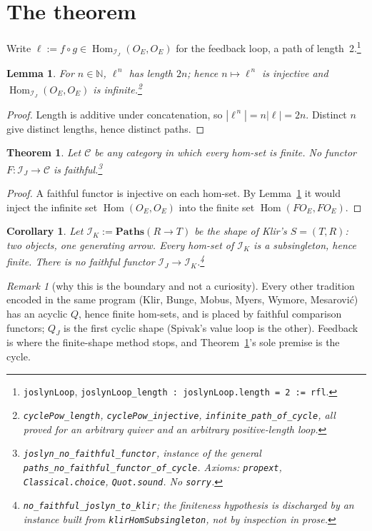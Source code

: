 \documentclass[10pt]{article}
\newtheorem{lemma}{Lemma}
\newtheorem{theorem}{Theorem}
\newtheorem{corollary}{Corollary}
\theoremstyle{remark}
\newtheorem{remark}{Remark}
\newcommand{\cat}[1]{\mathcal{#1}}
\newcommand{\Hom}{\operatorname{Hom}}
\newcommand{\Paths}{\mathbf{Paths}}
\newcommand{\lean}[1]{\texttt{#1}}
\begin{document}
\section{The theorem}

Write $\ell := f\circ g \in \Hom_{\cat{I}_J}(O_E,O_E)$ for the feedback loop, a path of length~2.\footnote{\lean{joslynLoop}, \lean{joslynLoop\_length : joslynLoop.length = 2 := rfl}.}

\begin{lemma}\label{lem:powers}
For $n\in\mathbb{N}$, $\ell^{\,n}$ has length $2n$; hence $n\mapsto \ell^{\,n}$ is injective and $\Hom_{\cat{I}_J}(O_E,O_E)$ is infinite.\footnote{\lean{cyclePow\_length}, \lean{cyclePow\_injective}, \lean{infinite\_path\_of\_cycle}, all proved for an arbitrary quiver and an arbitrary positive-length loop.}
\end{lemma}
\begin{proof}
Length is additive under concatenation, so $|\ell^{\,n}| = n|\ell| = 2n$. Distinct $n$ give distinct lengths, hence distinct paths.
\end{proof}

\begin{theorem}\label{thm:main}
Let $\cat{C}$ be any category in which every hom-set is finite. No functor $F\colon \cat{I}_J \to \cat{C}$ is faithful.\footnote{\lean{joslyn\_no\_faithful\_functor}, instance of the general \lean{paths\_no\_faithful\_functor\_of\_cycle}. Axioms: \lean{propext}, \lean{Classical.choice}, \lean{Quot.sound}. No \lean{sorry}.}
\end{theorem}
\begin{proof}
A faithful functor is injective on each hom-set. By Lemma~\ref{lem:powers} it would inject the infinite set $\Hom(O_E,O_E)$ into the finite set $\Hom(FO_E,FO_E)$.
\end{proof}

\begin{corollary}\label{cor:klir}
Let $\cat{I}_K := \Paths(R \to T)$ be the shape of Klir's $S=(T,R)$: two objects, one generating arrow. Every hom-set of $\cat{I}_K$ is a subsingleton, hence finite. There is no faithful functor $\cat{I}_J \to \cat{I}_K$.\footnote{\lean{no\_faithful\_joslyn\_to\_klir}; the finiteness hypothesis is discharged by an instance built from \lean{klirHomSubsingleton}, not by inspection in prose.}
\end{corollary}

\begin{remark}[why this is the boundary and not a curiosity]
Every other tradition encoded in the same program (Klir, Bunge, Mobus, Myers, Wymore, Mesarovi\'c) has an acyclic $Q$, hence finite hom-sets, and is placed by faithful comparison functors; $Q_J$ is the first cyclic shape (Spivak's value loop is the other). Feedback is where the finite-shape method stops, and Theorem~\ref{thm:main}'s sole premise is the cycle.
\end{remark}
\end{document}
